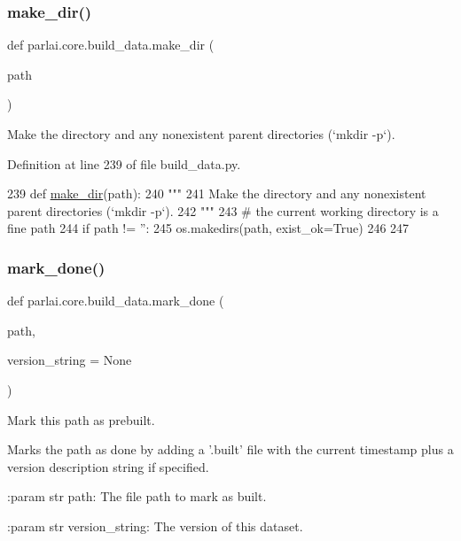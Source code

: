 \subsubsection{\texorpdfstring{make\+\_\+dir()}{make\_dir()}}
{\footnotesize\ttfamily def parlai.\+core.\+build\+\_\+data.\+make\+\_\+dir (\begin{DoxyParamCaption}\item[{}]{path }\end{DoxyParamCaption})}

\begin{DoxyVerb}Make the directory and any nonexistent parent directories (`mkdir -p`).
\end{DoxyVerb}
 

Definition at line 239 of file build\+\_\+data.\+py.


\begin{DoxyCode}
239 \textcolor{keyword}{def }\hyperlink{namespaceparlai_1_1core_1_1build__data_a6ce042fedd4194bd016845bbe7a8facf}{make\_dir}(path):
240     \textcolor{stringliteral}{"""}
241 \textcolor{stringliteral}{    Make the directory and any nonexistent parent directories (`mkdir -p`).}
242 \textcolor{stringliteral}{    """}
243     \textcolor{comment}{# the current working directory is a fine path}
244     \textcolor{keywordflow}{if} path != \textcolor{stringliteral}{''}:
245         os.makedirs(path, exist\_ok=\textcolor{keyword}{True})
246 
247 
\end{DoxyCode}
\mbox{\label{namespaceparlai_1_1core_1_1build__data_a2527e6d29b0ccb7b841182890ac36a59}} 
\subsubsection{\texorpdfstring{mark\+\_\+done()}{mark\_done()}}
{\footnotesize\ttfamily def parlai.\+core.\+build\+\_\+data.\+mark\+\_\+done (\begin{DoxyParamCaption}\item[{}]{path,  }\item[{}]{version\+\_\+string = {\ttfamily None} }\end{DoxyParamCaption})}

\begin{DoxyVerb}Mark this path as prebuilt.

Marks the path as done by adding a '.built' file with the current timestamp
plus a version description string if specified.

:param str path:
    The file path to mark as built.

:param str version_string:
    The version of this dataset.
\end{DoxyVerb}
 

